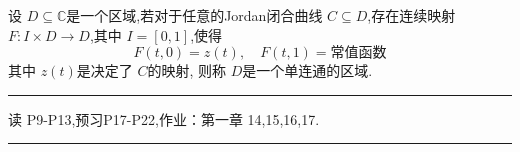 \documentclass[../../复变函数.tex]{subfiles}
\begin{document}
\hspace*{\fill} 

\begin{definition}
    设 \(  D\subseteq \mathbb{C}   \)是一个区域,若对于任意的Jordan闭合曲线 \(  C\subseteq D  \),存在连续映射 \(  F: I \times D\to D  \),其中 \(  I =  [0,1]  \),使得 \[
    F\left( t,0 \right)= z\left( t \right),\quad F\left( t,1 \right)= \text{常值函数}   
    \]  其中 \(  z\left( t \right)   \)是决定了 \(  C  \)的映射,    则称 \(  D  \)是一个单连通的区域. 
\end{definition}


\hspace*{\fill} 
\hrule
\hspace*{\fill}

读 P9-P13,预习P17-P22,作业：第一章 14,15,16,17.


\hspace*{\fill} 
\hrule
\hspace*{\fill}
\end{document}
